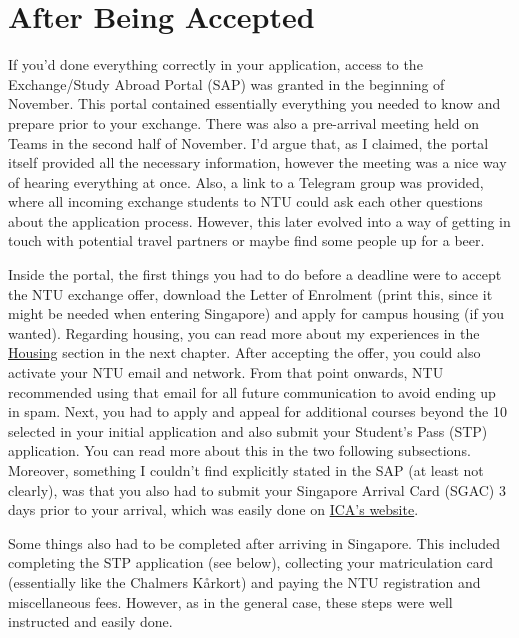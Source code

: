 \section*{After Being Accepted}
{}
If you'd done everything correctly in your application, access to the Exchange/Study Abroad Portal (SAP) was granted in the beginning of November. This portal contained essentially everything you needed to know and prepare prior to your exchange. There was also a pre-arrival meeting held on Teams in the second half of November. I'd argue that, as I claimed, the portal itself provided all the necessary information, however the meeting was a nice way of hearing everything at once. Also, a link to a Telegram group was provided, where all incoming exchange students to NTU could ask each other questions about the application process. However, this later evolved into a way of getting in touch with potential travel partners or maybe find some people up for a beer.

Inside the portal, the first things you had to do before a deadline were to accept the NTU exchange offer, download the Letter of Enrolment (print this, since it might be needed when entering Singapore) and apply for campus housing (if you wanted). Regarding housing, you can read more about my experiences in the \hyperref[house]{Housing} section in the next chapter. After accepting the offer, you could also activate your NTU email and network. From that point onwards, NTU recommended using that email for all future communication to avoid ending up in spam. Next, you had to apply and appeal for additional courses beyond the 10 selected in your initial application and also submit your Student's Pass (STP) application. You can read more about this in the two following subsections. Moreover, something I couldn't find explicitly stated in the SAP (at least not clearly), was that you also had to submit your Singapore Arrival Card (SGAC) 3 days prior to your arrival, which was easily done on \href{https://eservices.ica.gov.sg/sgarrivalcard/}{ICA's website}.

Some things also had to be completed after arriving in Singapore. This included completing the STP application (see below), collecting your matriculation card (essentially like the Chalmers Kårkort) and paying the NTU registration and miscellaneous fees. However, as in the general case, these steps were well instructed and easily done.


